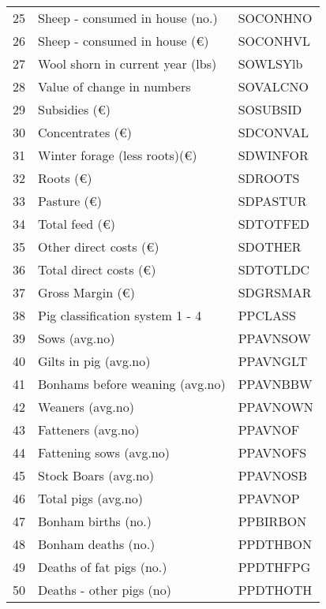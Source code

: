 \documentclass{article}\usepackage{graphicx, color}
\begin{document}
\begin{flushleft}
\begin{table}[ht]
\begin{center}
\begin{tabular}{rll}
  25 & Sheep - consumed in house     (no.) & SOCONHNO \\ 
  26 & Sheep - consumed in house     (€) & SOCONHVL \\ 
  27 & Wool shorn in current year    (lbs) & SOWLSYlb \\ 
  28 & Value of change in numbers & SOVALCNO \\ 
  29 & Subsidies                      (€) & SOSUBSID \\ 
  30 & Concentrates              (€) & SDCONVAL \\ 
  31 & Winter forage (less roots)(€) & SDWINFOR \\ 
  32 & Roots                     (€) & SDROOTS \\ 
  33 & Pasture                   (€) & SDPASTUR \\ 
  34 & Total feed                (€) & SDTOTFED \\ 
  35 & Other direct costs        (€) & SDOTHER \\ 
  36 & Total direct costs        (€) & SDTOTLDC \\ 
  37 & Gross Margin              (€) & SDGRSMAR \\ 
  38 & Pig classification system  1 - 4 & PPCLASS \\ 
  39 & Sows                (avg.no) & PPAVNSOW \\ 
  40 & Gilts in pig        (avg.no) & PPAVNGLT \\ 
  41 & Bonhams before weaning (avg.no) & PPAVNBBW \\ 
  42 & Weaners             (avg.no) & PPAVNOWN \\ 
  43 & Fatteners           (avg.no) & PPAVNOF \\ 
  44 & Fattening sows      (avg.no) & PPAVNOFS \\ 
  45 & Stock Boars         (avg.no) & PPAVNOSB \\ 
  46 & Total pigs          (avg.no) & PPAVNOP \\ 
  47 & Bonham births           (no.) & PPBIRBON \\ 
  48 & Bonham deaths           (no.) & PPDTHBON \\ 
  49 & Deaths of fat pigs      (no.) & PPDTHFPG \\ 
  50 & Deaths - other pigs        (no) & PPDTHOTH \\ 
   \hline
\end{tabular}
\end{center}
\end{table}



\end{flushleft}
\end{document}
